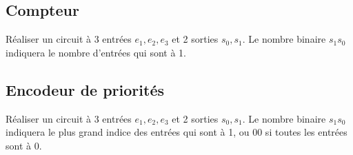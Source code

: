 \subsection{Compteur}

R\'ealiser un circuit \`a 3 entr\'ees $e_1,e_2,e_3$ et 2 sorties $s_0,s_1$.
Le nombre binaire $s_1s_0$ indiquera le nombre d'entr\'ees qui sont \`a 1.


\subsection{Encodeur de priorit\'es}

R\'ealiser un circuit \`a 3 entr\'ees $e_1,e_2,e_3$ et 2 sorties $s_0,s_1$.
Le nombre binaire $s_1s_0$ indiquera le plus grand indice des entr\'ees
qui sont \`a 1, ou $00$ si toutes les entr\'ees sont \`a 0.





